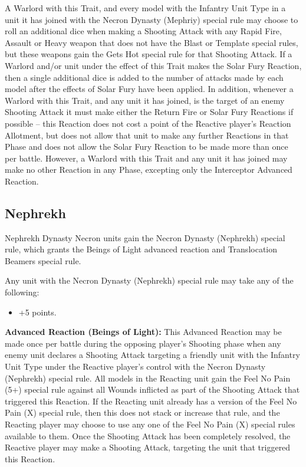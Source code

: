 \begin{multicols}{2}
A Warlord with this Trait, and every model with the Infantry Unit Type in a unit it has joined with the Necron Dynasty (Mephriy) special rule may choose to roll an additional dice when making a Shooting Attack with any Rapid Fire, Assault or Heavy weapon that does not have the Blast or Template special rules, but these weapons gain the Gets Hot special rule for that Shooting Attack. If a Warlord and/or unit under the effect of this Trait makes the Solar Fury Reaction, then a single additional dice is added to the number of attacks made by each model after the effects of Solar Fury have been applied. In addition, whenever a Warlord with this Trait, and any unit it has joined, is the target of an enemy Shooting Attack it must make either the Return Fire or Solar Fury Reactions if possible – this Reaction does not cost a point of the Reactive player’s Reaction Allotment, but does not allow that unit to make any further Reactions in that Phase and does not allow the Solar Fury Reaction to be made more than once per battle. However, a Warlord with this Trait and any unit it has joined may make no other Reaction in any Phase, excepting only the Interceptor Advanced Reaction.


\newpage
\subsection{Nephrekh}

Nephrekh Dynasty Necron units gain the Necron Dynasty (Nephrekh) special rule, which grants the Beings of Light advanced reaction and Translocation Beamers special rule.

Any unit with the Necron Dynasty (Nephrekh) special rule may take any of the following:
\begin{itemize}
	\item {} \dotfill +5 points.
\end{itemize}

\textbf{Advanced Reaction (Beings of Light):} This Advanced Reaction may be made once per battle during the opposing player’s Shooting phase when any enemy unit declares a Shooting Attack targeting a friendly unit with the Infantry Unit Type under the Reactive player’s control with the Necron Dynasty (Nephrekh) special rule. All models in the Reacting unit gain the Feel No Pain (5+) special rule against all Wounds inflicted as part of the Shooting Attack that triggered this Reaction. If the Reacting unit already has a version of the Feel No Pain (X) special rule, then this does not stack or increase that rule, and the Reacting player may choose to use any one of the Feel No Pain (X) special rules available to them. Once the Shooting Attack has been completely resolved, the Reactive player may make a Shooting Attack, targeting the unit that triggered this Reaction.


\end{multicols}

